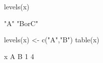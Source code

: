 \begin{Schunk}
\begin{Sinput}
  levels(x)
\end{Sinput}
\begin{Soutput}
[1] "A"    "BorC"
\end{Soutput}
\begin{Sinput}
  levels(x) <- c("A","B")
  table(x)
\end{Sinput}
\begin{Soutput}
x
A B 
1 4 
\end{Soutput}
\end{Schunk}
